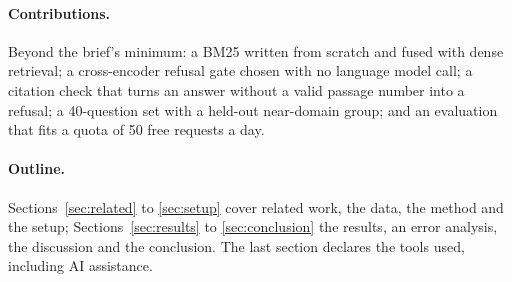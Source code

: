 \paragraph{Contributions.} Beyond the brief's minimum: a BM25 written from scratch and fused with dense retrieval; a cross-encoder refusal gate chosen with no language model call; a citation check that turns an answer without a valid passage number into a refusal; a 40-question set with a held-out near-domain group; and an evaluation that fits a quota of 50 free requests a day.

\paragraph{Outline.} Sections~\ref{sec:related} to \ref{sec:setup} cover related work, the data, the method and the setup; Sections~\ref{sec:results} to \ref{sec:conclusion} the results, an error analysis, the discussion and the conclusion. The last section declares the tools used, including AI assistance.

